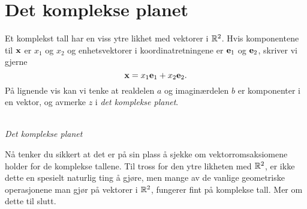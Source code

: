 \section*{Det komplekse planet}

Et komplekst tall har en viss ytre likhet med vektorer i $\mathbb{R}^2$. Hvis komponentene til $\mathbf{x}$ er $x_1$ og $x_2$ og enhetsvektorer i koordinatretningene er $\mathbf{e}_1$ og $\mathbf{e}_2$, skriver vi gjerne
\[
\mathbf{x}=x_1 \mathbf{e}_1+x_2 \mathbf{e}_2.
\]
På lignende vis kan vi tenke at realdelen $a$ og imaginærdelen $b$ er komponenter i en vektor, og avmerke $z$ i \emph{det komplekse planet}.
\begin{center}
\\
{\small \textit{Det komplekse planet}}
\end{center}
Nå tenker du sikkert at det er på sin plass å sjekke om vektorromsaksiomene holder for de komplekse tallene. Til tross for den ytre likheten med $\mathbb{R}^2$, er ikke dette en spesielt naturlig ting å gjøre, men mange av de vanlige geometriske operasjonene man gjør på vektorer i $\mathbb{R}^2$, fungerer fint på komplekse tall. Mer om dette til slutt. 

